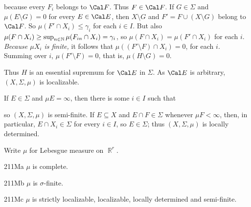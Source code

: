 {\noindent because every $F_i$ belongs to $\Cal F$.   Thus $F\in\Cal F$.
If $G\in\Sigma$ and
$\mu(E\setminus G)=0$ for every $E\in\Cal E$, then $X\setminus G$ and
$F'=F\cup(X\setminus G)$ belong to $\Cal F$.   So
$\mu(F'\cap X_i)\le\gamma_i$ for each $i\in I$.   But also
$\mu(F\cap X_i)\ge\sup_{n\in\Bbb N}\mu(F_{in}\cap X_i)=\gamma_i$, so $\mu(F\cap X_i)=\mu(F'\cap X_i)$ for each $i$.   {\it Because $\mu X_i$ is finite,}
it follows that $\mu((F'\setminus F)\cap X_i)=0$, for each $i$.
Summing over $i$, $\mu(F'\setminus F)=0$, that is,
$\mu(H\setminus G)=0$.
     
Thus $H$ is an essential supremum for $\Cal E$ in
$\Sigma$.   As $\Cal E$ is arbitrary, $(X,\Sigma,\mu)$ is localizable.
     
\medskip
     
If $E\in\Sigma$ and $\mu E=\infty$, then there is some $i\in I$ such
that
     
     
\noindent  so $(X,\Sigma,\mu)$ is
semi-finite.    If $E\subseteq X$ and $E\cap F\in\Sigma$ whenever $\mu
F<\infty$, then, in particular, $E\cap X_i\in\Sigma$ for every $i\in I$,
so $E\in\Sigma$;  thus $(X,\Sigma,\mu)$ is locally determined.
}%
     
   Write $\mu$ for Lebesgue measure on $\BbbR^r$.
     
\spheader 211Ma $\mu$ is complete.
     
\spheader 211Mb $\mu$ is $\sigma$-finite.
     
\spheader 211Mc $\mu$
is strictly
localizable, localizable, locally
determined and semi-finite.
     
